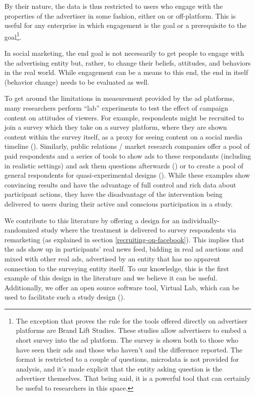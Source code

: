 \documentclass[a4paper,12pt]{article}
\begin{document}
By their nature, the data is thus restricted to users who engage with the properties of the advertiser in some fashion, either on or off-platform. This is useful for any enterprise in which engagement is the goal or a prerequisite to the goal\footnote{The exception that proves the rule for the tools offered directly on advertiser platforms are Brand Lift Studies. These studies allow advertisers to embed a short survey into the ad platform. The survey is shown both to those who have seen their ads and those who haven't and the difference reported. The format is restricted to a couple of questions, microdata is not provided for analysis, and it's made explicit that the entity asking question is the advertiser themselves. That being said, it is a powerful tool that can certainly be useful to researchers in this space.}. 

In social marketing, the end goal is not necessarily to get people to engage with the advertising entity but, rather, to change their beliefs, attitudes, and behaviors in the real world. While engagement can be a means to this end, the end in itself (behavior change) needs to be evaluated as well.

To get around the limitations in measurement provided by the ad platforms, many researchers perform ``lab'' experiments to test the effect of campaign content on attitudes of viewers. For example, respondents might be recruited to join a survey which they take on a survey platform, where they are shown content within the survey itself, as a proxy for seeing content on a social media timeline (\cite{Henry2020,Donati2020}). Similarly, public relations / market research companies offer a pool of paid respondents and a series of tools to show ads to these respondants (including in realistic settings) and ask them questions afterwards (\cite{Evans2021}) or to create a pool of general respondents for quasi-experimental designs (\cite{Sampogna2017}). While these examples show convincing results and have the advantage of full control and rich data about participant actions, they have the disadvantage of the intervention being delivered to users during their active and conscious participation in a study.

We contribute to this literature by offering a design for an individually-randomized study where the treatment is delivered to survey respondents via remarketing (as explained in section \ref{recruiting-on-facebook}). This implies that the ads show up in participants' real news feed, bidding in real ad auctions and mixed with other real ads, advertised by an entity that has no apparent connection to the surveying entity itself. To our knowledge, this is the first example of this design in the literature and we believe it can be useful. Additionally, we offer an open source software tool, Virtual Lab, which can be used to facilitate such a study design (\cite{Rao2020}).
\end{document}
